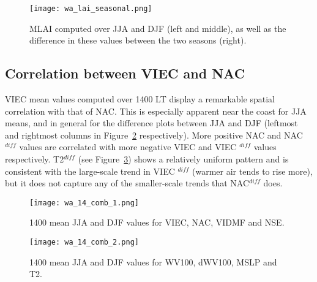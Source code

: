 \begin{figure}[!ht]
	\centering
	\texttt{[image: wa\_lai\_seasonal.png]}
	\caption[MLAI seasonal comparison for WA focus region]{\ac{MLAI} computed over \acs{JJA} and \acs{DJF} (left and middle), as well as the difference in these values between the two seasons (right).}
	\label{fig:wa_lai_seasonal}
\end{figure}

\subsection{Correlation between VIEC and NAC}

\ac{VIEC} mean values computed over 1400 \ac{LT} display a remarkable spatial correlation with that of \ac{NAC}. This is especially apparent near the coast for \ac{JJA} means, and in general for the difference plots between \ac{JJA} and \ac{DJF} (leftmost and rightmost columns in Figure~\ref{fig:wa_14_comb_1} respectively). More positive \ac{NAC} and \ac{NAC}$^{diff}$ values are correlated with more negative \ac{VIEC} and \ac{VIEC} $^{diff}$ values respectively. \ac{T2}$^{diff}$ (see Figure~\ref{fig:wa_14_comb_2}) shows a relatively uniform pattern and is consistent with the large-scale trend in \ac{VIEC} $^{diff}$ (warmer air tends to rise more), but it does not capture any of the smaller-scale trends that \ac{NAC}$^{diff}$ does.

\begin{figure}[!htp]
	\centering
	\texttt{[image: wa\_14\_comb\_1.png]}
	\caption[1400 means for selected variables 1]{1400 mean \acs{JJA} and \acs{DJF} values for \acs{VIEC}, \acs{NAC}, \acs{VIDMF} and \acs{NSE}.}
	\label{fig:wa_14_comb_1}
\end{figure}

\begin{figure}[!htp]
	\centering
	\texttt{[image: wa\_14\_comb\_2.png]}
	\caption[1400 means for selected variables 2]{1400 mean \acs{JJA} and \acs{DJF} values for \acs{WV100}, \acs{dWV100}, \acs{MSLP} and \acs{T2}.}
	\label{fig:wa_14_comb_2}
\end{figure}

